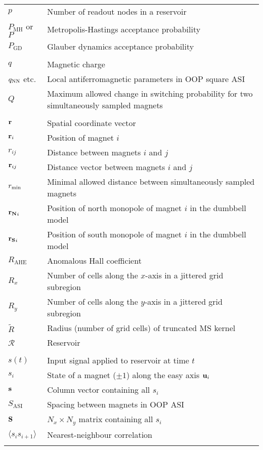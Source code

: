 \begin{longtable}[l]{p{60pt} p{350pt}}
	$p$ & Number of readout nodes in a reservoir \\
	$P_\mathrm{MH}$ or $P$ & Metropolis-Hastings acceptance probability \\
	$P_\mathrm{GD}$ & Glauber dynamics acceptance probability \\
	&\\

	$q$ & Magnetic charge \\
	$q_\mathrm{NN}$ etc. & Local antiferromagnetic parameters in OOP square ASI \\
	$Q$ & Maximum allowed change in switching probability for two simultaneously sampled magnets \\
	&\\

	$\boldsymbol{\mathbf{r}}$ & Spatial coordinate vector \\
	$\boldsymbol{\mathbf{r}}_i$ & Position of magnet $i$ \\
	$r_{ij}$ & Distance between magnets $i$ and $j$ \\
	$\boldsymbol{\mathbf{r}}_{ij}$ & Distance vector between magnets $i$ and $j$ \\
	$r_\mathrm{min}$ & Minimal allowed distance between simultaneously sampled magnets \\
	$\boldsymbol{\mathbf{r_N}}_i$ & Position of north monopole of magnet $i$ in the dumbbell model \\
	$\boldsymbol{\mathbf{r_S}}_i$ & Position of south monopole of magnet $i$ in the dumbbell model \\
	$R_\mathrm{AHE}$ & Anomalous Hall coefficient \\
	$R_x$ & Number of cells along the $x$-axis in a jittered grid subregion \\
	$R_y$ & Number of cells along the $y$-axis in a jittered grid subregion \\
	$\widetilde{R}$ & Radius (number of grid cells) of truncated MS kernel \\
	$\mathcal{R}$ & Reservoir \\
	&\\

	$s(t)$ & Input signal applied to reservoir at time $t$ \\
	$s_i$ & State of a magnet ($\pm 1$) along the easy axis $\boldsymbol{\mathbf{u}}_i$ \\
	$\boldsymbol{\mathbf{s}}$ & Column vector containing all $s_i$ \\
	$S_\mathrm{ASI}$ & Spacing between magnets in OOP ASI \\
	$\boldsymbol{\mathbf{S}}$ & $N_x \times N_y$ matrix containing all $s_i$ \\
	$\langle s_i s_{i+1} \rangle$ & Nearest-neighbour correlation \\
	&\\


\end{longtable}
